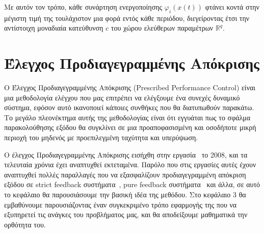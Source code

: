 Με αυτόν τον τρόπο, κάθε συνάρτηση ενεργοποίησης $\varphi_i(x(t))$ φτάνει κοντά στην μέγιστη τιμή της τουλάχιστον μια φορά εντός κάθε περιόδου, διεγείροντας έτσι την αντίστοιχη μοναδιαία κατεύθυνση $c$ του χώρου ελεύθερων παραμέτρων $\mathbb{R}^q$.


\section{Έλεγχος Προδιαγεγραμμένης Απόκρισης} \label{sec:ppc_introduction}
Ο Έλεγχος Προδιαγεγραμμένης Απόκρισης (Prescribed Performance Control) είναι μια μεθοδολογία ελέγχου που μας επιτρέπει να ελέγξουμε ένα συνεχές δυναμικό σύστημα, εφόσον αυτό ικανοποιεί κάποιες συνθήκες που θα διατυπωθούν παρακάτω. Το μεγάλο πλεονέκτημα αυτής της μεθοδολογίας είναι ότι εγγυάται πως το σφάλμα παρακολούθησης εξόδου θα συγκλίνει σε μια προαποφασισμένη και οσοδήποτε μικρή περιοχή του μηδενός με προεπιλεγμένη ταχύτητα και υπερύψωση.

Ο έλεγχος Προδιαγεγραμμένης Απόκρισης εισήχθη στην εργασία~\cite{bechlioulis2008robust} το 2008, και τα τελευταία χρόνια έχει αναπτυχθεί εκτεταμένα. Παρόλο που στις εργασίες αυτές έχουν αναπτυχθεί πολλές παραλλαγές που να εξασφαλίζουν προδιαγεγραμμένη απόκριση εξόδου σε strict feedback συστήματα~\cite{bechlioulis2009adaptive}, pure feedback συστήματα~\cite{bechlioulis2014low} και άλλα, σε αυτό το κεφάλαιο θα παρουσιάσουμε την βασική ιδέα της μεθόδου. Στο κεφάλαιο 3 θα εμβαθύνουμε παρουσιάζοντας έναν συγκεκριμένο τρόπο εφαρμογής της που να εξυπηρετεί τις ανάγκες του προβλήματος μας, και θα αποδείξουμε μαθηματικά την ορθότητα του.

